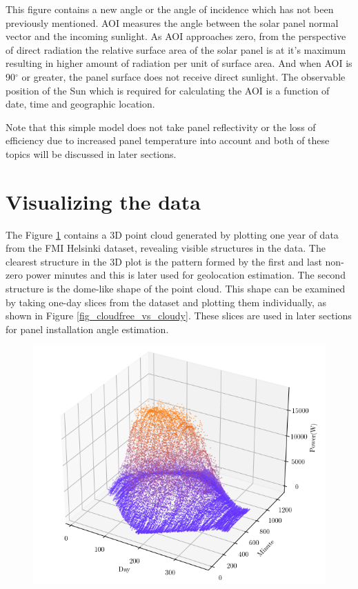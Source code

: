This figure contains a new angle  or the angle of incidence which has not been previously mentioned. AOI measures the angle between the solar panel normal vector and the incoming sunlight. As AOI approaches zero, from the perspective of direct radiation the relative surface area of the solar panel is at it's maximum resulting in higher amount of radiation per unit of surface area. And when AOI is 90$^\circ$ or greater, the panel surface does not receive direct sunlight. The observable position of the Sun which is required for calculating the AOI is a function of date, time and geographic location.

Note that this simple model does not take panel reflectivity or the loss of efficiency due to increased panel temperature into account and both of these topics will be discussed in later sections.



\section{Visualizing the data}
The Figure \ref{fig_oneyear_pointcloud} contains a 3D point cloud generated by plotting one year of data from the FMI Helsinki dataset, revealing visible structures in the data. The clearest structure in the 3D plot is the pattern formed by the first and last non-zero power minutes and this is later used for geolocation estimation. The second structure is the dome-like shape of the point cloud. This shape can be examined by taking one-day slices from the dataset and plotting them individually, as shown in Figure  \ref{fig_cloudfree_vs_cloudy}. These slices are used in later sections for panel installation angle estimation.

\begin{figure}[h]
\centering
\includegraphics[width=0.8\linewidth]{pics/oneyear2}
\label{fig_oneyear_pointcloud}
\end{figure}

